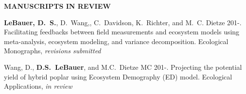 \documentclass[10pt,twoside]{article}
\begin{document}



\textbf{MANUSCRIPTS IN REVIEW}
\begin{itemize*}

\item \noindent%
\textbf{LeBauer, D.~S.}, D.~Wang,, C.~Davidson, K.~Richter, and M.~C. Dietze 201-. Facilitating feedbacks between field measurements and ecosystem models using meta-analysis, ecosystem modeling, and variance decomposition. Ecological Monographs, \textit{revisions submitted} 

\item \noindent Wang, D., \textbf{D.S.~LeBauer}, and M.C.~Dietze MC 201-. Projecting the potential yield of hybrid poplar using Ecosystem Demography (ED) model.  Ecological Applications, \textit{in review}
\end{itemize*}
\end{document}
